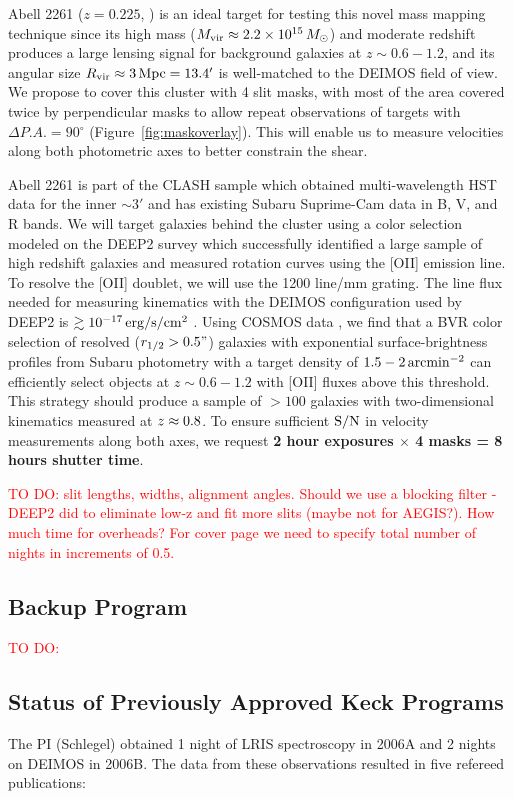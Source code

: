 \documentclass[12pt]{article}
\newcommand{\degr}{\ensuremath{^\circ}}
\begin{document}
Abell 2261 ($z=0.225$, \citealt{Coe2012}) is an ideal target for testing this novel mass mapping technique since its high mass ($M_{\rm vir}\approx 2.2 \times 10^{15}\,M_{\odot}$) and moderate redshift produces a large lensing signal for background galaxies at $z\sim0.6-1.2$, and its angular size $R_{\rm vir} \approx 3\,{\rm Mpc} = 13.4'$ is well-matched to the DEIMOS field of view. We propose to cover this cluster with 4 slit masks, with most of the area covered twice by perpendicular masks to allow repeat observations of targets with $\Delta P.A.=90\degr$ (Figure~\ref{fig:maskoverlay}). This will enable us to measure velocities along both photometric axes to better constrain the shear.

Abell 2261 is part of the CLASH sample \citep{Postman2012} which obtained multi-wavelength HST data for the inner $\sim3'$ and has existing Subaru Suprime-Cam data in B, V, and R bands. We will target galaxies behind the cluster using a color selection modeled on the DEEP2 survey \citep{Newman2013} which successfully identified a large sample of high redshift galaxies and measured rotation curves using the [OII] emission line. To resolve the [OII] doublet, we will use the 1200 line/mm grating. The line flux needed for measuring kinematics with the DEIMOS configuration used by DEEP2 is $\gtrsim10^{-17}\,{\rm erg/s/cm^2}$ \citep{Kassin2012}. Using COSMOS data \citep{Jouvel2009}, we find that a BVR color selection of resolved ($r_{1/2}>0.5"$) galaxies with exponential surface-brightness profiles from Subaru photometry with a target density of $1.5-2\,{\rm arcmin^{-2}}$ can efficiently select objects at $z\sim0.6-1.2$ with [OII] fluxes above this threshold. This strategy should produce a sample of $>100$ galaxies with two-dimensional kinematics measured at $z_{\rm}\approx0.8$. To ensure sufficient ${\rm S/N}$ in velocity measurements along both axes, we request \textbf{2 hour exposures $\times$ 4 masks = 8 hours shutter time}.

\textcolor{Red}{TO DO: slit lengths, widths, alignment angles. Should we use a blocking filter - DEEP2 did to eliminate low-z and fit more slits (maybe not for AEGIS?). How much time for overheads? For cover page we need to specify total number of nights in increments of 0.5.}

\subsection{Backup Program}
\textcolor{Red}{TO DO:}

\subsection{Status of Previously Approved Keck Programs}
The PI (Schlegel) obtained 1 night of LRIS spectroscopy in 2006A and 2 nights on DEIMOS in 2006B. The data from these observations resulted in five refereed publications:
\end{document}
